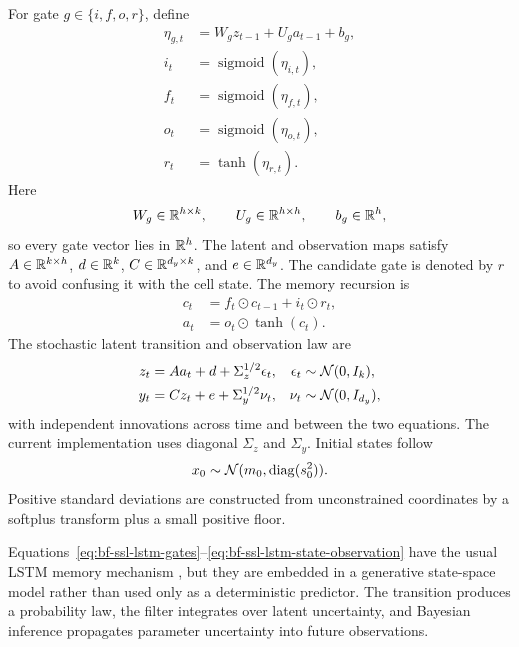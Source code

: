 For gate $g\in\{i,f,o,r\}$, define
\begin{align}
  \eta_{g,t}
    &= W_g z_{t-1}+U_g a_{t-1}+b_g,                                      \\
  i_t &= \operatorname{sigmoid}(\eta_{i,t}),                              \\
  f_t &= \operatorname{sigmoid}(\eta_{f,t}),                              \\
  o_t &= \operatorname{sigmoid}(\eta_{o,t}),                              \\
  r_t &= \tanh(\eta_{r,t}).
  \label{eq:bf-ssl-lstm-gates}
\end{align}
Here
\[
  W_g\in\mathbb{R}^{h\times k},\qquad
  U_g\in\mathbb{R}^{h\times h},\qquad
  b_g\in\mathbb{R}^h,
\]
so every gate vector lies in $\mathbb{R}^h$.  The latent and observation maps satisfy
$A\in\mathbb{R}^{k\times h}$, $d\in\mathbb{R}^k$, $C\in\mathbb{R}^{d_y\times k}$, and
$e\in\mathbb{R}^{d_y}$.
The candidate gate is denoted by $r$ to avoid confusing it with the cell state.
The memory recursion is
\begin{align}
  c_t &= f_t\odot c_{t-1}+i_t\odot r_t,                                    \\
  a_t &= o_t\odot\tanh(c_t).
  \label{eq:bf-ssl-lstm-memory}
\end{align}
The stochastic latent transition and observation law are
\begin{align}
  z_t &= A a_t+d+\Sigma_z^{1/2}\epsilon_t,
  &\epsilon_t&\sim\mathcal{N}(0,I_k),                                           \\
  y_t &= C z_t+e+\Sigma_y^{1/2}\nu_t,
  &\nu_t&\sim\mathcal{N}(0,I_{d_y}),
  \label{eq:bf-ssl-lstm-state-observation}
\end{align}
with independent innovations across time and between the two equations.  The
current implementation uses diagonal $\Sigma_z$ and $\Sigma_y$.  Initial
states follow
\begin{equation}
  x_0\sim\mathcal{N}(m_0,\operatorname{diag}(s_0^2)).
  \label{eq:bf-ssl-lstm-initial-law}
\end{equation}
Positive standard deviations are constructed from unconstrained coordinates
by a softplus transform plus a small positive floor.

Equations~\eqref{eq:bf-ssl-lstm-gates}--\eqref{eq:bf-ssl-lstm-state-observation}
have the usual LSTM memory mechanism \citep{hochreiter1997lstm}, but they are
embedded in a generative state-space model rather than used only as a
deterministic predictor.  The transition produces a probability law, the
filter integrates over latent uncertainty, and Bayesian inference propagates
parameter uncertainty into future observations.

